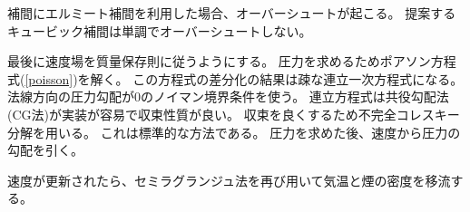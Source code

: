 補間にエルミート補間を利用した場合、オーバーシュートが起こる。
提案するキュービック補間は単調でオーバーシュートしない。

最後に速度場を質量保存則に従うようにする。
圧力を求めるためポアソン方程式(\ref{poisson})を解く。
この方程式の差分化の結果は疎な連立一次方程式になる。
法線方向の圧力勾配が0のノイマン境界条件を使う。
連立方程式は共役勾配法(CG法)が実装が容易で収束性質が良い。
収束を良くするため不完全コレスキー分解を用いる。
これは標準的な方法である。
圧力を求めた後、速度から圧力の勾配を引く。

速度が更新されたら、セミラグランジュ法を再び用いて気温と煙の密度を移流する。

